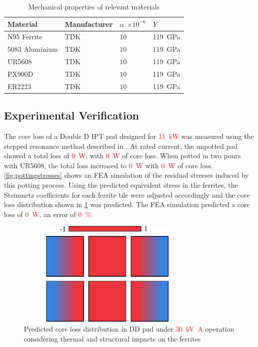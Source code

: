 \documentclass[conference]{IEEEtran}
\begin{document}
\begin{table}
  \centering
  \caption{Mechanical properties of relevant materials}
  \begin{tabular}{@{}llll@{}}
    \toprule
    Material & Manufacturer & $\alpha$ $\times 10^{-6}$ & $Y$ \\ \midrule
    N95 Ferrite & TDK & $10$ & \SI{119}{\giga\pascal} \\
    5083 Aluminium & TDK & $10$ & \SI{119}{\giga\pascal} \\
    UR5608 & TDK & $10$ & \SI{119}{\giga\pascal} \\
    PX900D & TDK & $10$ & \SI{119}{\giga\pascal} \\
    ER2223 & TDK & $10$ & \SI{119}{\giga\pascal} \\
    \bottomrule
  \end{tabular}
\end{table}

\subsection{Experimental Verification}

The core loss of a Double D IPT pad designed for \textcolor{red}{\SI{11}{\kilo\watt}} was measured using the stepped resonance method described in \cite{kalraPowerLossMeasurement2020}.
At rated current, the unpotted pad showed a total loss of \textcolor{red}{\SI{0}{\watt}}, with \textcolor{red}{\SI{0}{\watt}} of core loss.
When potted in two pours with UR5608, the total loss increased to \textcolor{red}{\SI{0}{\watt}} with \textcolor{red}{\SI{0}{\watt}} of core loss. 
\cref{fig:pottingstresses} shows an FEA simulation of the residual stresses induced by this potting process. 
Using the predicted equivalent stress in the ferrites, the Steinmetz coefficients for each ferrite tile were adjusted accordingly and the core loss distribution shown in \cref{fig:padcoreloss} was predicted. 
The FEA simulation predicted a core loss of \textcolor{red}{\SI{0}{\watt}}, an error of \textcolor{red}{\SI{0}{\percent}}. 

\begin{figure}[t]
  \includegraphics[width=3.5in, height=2in]{figures/simulatedpottingpadstresses.pdf}
  \caption{Predicted core loss distribution in DD pad under \textcolor{red}{\SI{30}{\kilo\volt\ampere}} operation considering thermal and structural impacts on the ferrites}
  \label{fig:padcoreloss}
\end{figure}
\end{document}
